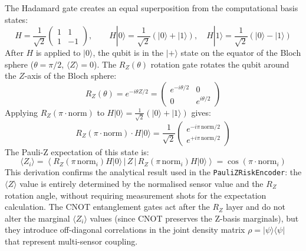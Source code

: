 The Hadamard gate creates an equal superposition from the computational basis states:
\begin{equation}
    H = \frac{1}{\sqrt{2}}\begin{pmatrix} 1 & 1 \\ 1 & -1 \end{pmatrix}, \qquad
    H|0\rangle = \frac{1}{\sqrt{2}}(|0\rangle + |1\rangle), \quad
    H|1\rangle = \frac{1}{\sqrt{2}}(|0\rangle - |1\rangle)
    \label{eq:hadamard}
\end{equation}
After $H$ is applied to $|0\rangle$, the qubit is in the $|+\rangle$ state on the equator of the Bloch sphere ($\theta = \pi/2$, $\langle Z \rangle = 0$). The $R_Z(\theta)$ rotation gate rotates the qubit around the $Z$-axis of the Bloch sphere:
\begin{equation}
    R_Z(\theta) = e^{-i\theta Z/2} = \begin{pmatrix} e^{-i\theta/2} & 0 \\ 0 & e^{i\theta/2} \end{pmatrix}
    \label{eq:rz_gate}
\end{equation}
Applying $R_Z(\pi \cdot \text{norm})$ to $H|0\rangle = \frac{1}{\sqrt{2}}(|0\rangle + |1\rangle)$ gives:
\begin{equation}
    R_Z(\pi \cdot \text{norm}) \cdot H|0\rangle = \frac{1}{\sqrt{2}}\begin{pmatrix} e^{-i\pi\,\text{norm}/2} \\ e^{+i\pi\,\text{norm}/2} \end{pmatrix}
    \label{eq:rz_applied}
\end{equation}
The Pauli-Z expectation of this state is:
\begin{equation}
    \langle Z_i \rangle = \left\langle R_Z(\pi\,\text{norm}_i) H |0\rangle \,\Big|\, Z \,\Big|\, R_Z(\pi\,\text{norm}_i) H |0\rangle \right\rangle = \cos(\pi \cdot \text{norm}_i)
    \label{eq:z_expectation_derivation}
\end{equation}
This derivation confirms the analytical result used in the \texttt{PauliZRiskEncoder}: the $\langle Z \rangle$ value is entirely determined by the normalised sensor value and the $R_Z$ rotation angle, without requiring measurement shots for the expectation calculation. The CNOT entanglement gates act after the $R_Z$ layer and do not alter the marginal $\langle Z_i \rangle$ values (since CNOT preserves the Z-basis marginals), but they introduce off-diagonal correlations in the joint density matrix $\rho = |\psi\rangle\langle\psi|$ that represent multi-sensor coupling.

